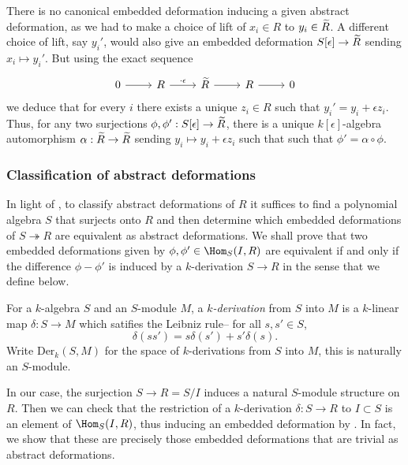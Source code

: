 \begin{remark}
There is no canonical embedded deformation inducing a given abstract
deformation, as we had to make a choice of lift of $x_i\in R$ to $y_i\in\widetilde{R}$.
A different choice of lift, say $y_i'$, would also give an embedded deformation
$S[\epsilon]\to\widetilde{R}$ sending $x_i\mapsto y_i'$. But using the exact sequence 
\[\begin{tikzcd} 
    0 & R & \wt{R} & R & 0
    \arrow[from=1-1, to=1-2]
    \arrow["\cdot\epsilon", from=1-2, to=1-3]
    \arrow[from=1-3, to=1-4]
    \arrow["", from=1-4, to=1-5]
\end{tikzcd}\]
we deduce that for every $i$ there exists a unique $z_i\in R$ such that
$y_i'=y_i+\epsilon z_i$. Thus, for any two surjections
$\phi,\phi':S[\epsilon]\to\widetilde{R}$, there is a unique $k[\epsilon]$-algebra
automorphism \(\alpha:\widetilde{R}\rightarrow \widetilde{R}\) sending \(y_i\mapsto y_i +
\epsilon z_i\) such that such that $\phi'=\alpha\circ\phi$.
\end{remark}

\subsubsection{Classification of abstract deformations} 
In light of , to classify abstract deformations of
\(R\) it suffices to find a polynomial algebra \(S\) that surjects onto \(R\)
and then determine which embedded deformations of \(S\twoheadrightarrow R\) are
equivalent as abstract deformations. We shall prove that two embedded
deformations given by \(\phi,\phi'\in \Hom_S(I,R)\) are equivalent if and only
if the difference \(\phi-\phi'\) is induced by a \(k\)-derivation \(S\rightarrow
R\) in the sense that we define below.

\begin{definition} 
    For a \(k\)-algebra \(S\) and an \(S\)-module $M$, a 
    \textit{$k$-derivation} from $S$ into $M$ is a \(k\)-linear map $\delta:S\to
    M$ which satifies the Leibniz rule-- for all $s,s'\in S$,
    \[\delta(ss')=s\delta(s')+s'\delta(s).\] 
    Write \(\text{Der}_k(S,M)\) for the space of \(k\)-derivations from \(S\)
    into \(M\), this is naturally an \(S\)-module.
\end{definition}

In our case, the surjection \(S\rightarrow R= S/I\) induces a natural
\(S\)-module structure on \(R\). Then we can check that the restriction of a
\(k\)-derivation \(\delta:S\rightarrow R\) to \(I\subset S\) is an element of
\(\Hom_S(I,R)\), thus inducing an embedded deformation by . In
fact, we show that these are precisely those embedded deformations that are
trivial as abstract deformations.

